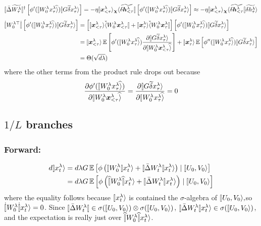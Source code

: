 \documentclass{article}
\theoremstyle{plain}
\theoremstyle{definition}
\begin{document}
\[
\oplim{\bar{\Delta}\widetilde{W_{\tau}^{\lambda}}}^{\dagger}\left[\phi'(\hatket{W_{0}^{\lambda}x_{\tau}^{\lambda}})\ket{G\tilde\delta x_{\tau}^{\lambda}}\right]=-\eta\ketdbra{\xx_{<\tau}^{\lambda}}{\cchi}{\widetilde{\delta\hh_{<\tau}^{\lambda}}}\left[\phi'(\hatket{W_{0}^{\lambda}x_{\tau}^{\lambda}})\ket{G\tilde\delta x_{\tau}^{\lambda}}\right]\approx-\eta\ketdbra{\xx_{<\tau}^{\lambda}}{\cchi}{\widetilde{\delta\hh_{<\tau}^{\lambda}}}\widetilde{\delta h_{\tau}^{\lambda}}\ra
\]
\begin{align*}
\dotoplim{W_{0}^{\lambda\trsp}}\left[\phi'(\hatket{W_{0}^{\lambda}x_{\tau}^{\lambda}})\ket{G\tilde\delta x_{\tau}^{\lambda}}\right] & =\left[\ket{\xx_{<\tau}^{\lambda}}\dbra{W_{0}^{\lambda}\xx_{<\tau}^{\lambda}}+\ket{\xx_{\tau}^{\lambda}}\dbra{W_{0}^{\lambda}\xx_{\tau}^{\lambda}}\right]\left[\phi'(\hatket{W_{0}^{\lambda}x_{\tau}^{\lambda}})\ket{G\tilde\delta x_{\tau}^{\lambda}}\right]\\
 & =\ket{\xx_{<\tau}^{\lambda}}\EV\left[\phi'(\hatket{W_{0}^{\lambda}x_{\tau}^{\lambda}})\frac{\partial\ket{G\tilde\delta x_{\tau}^{\lambda}}}{\partial\hatket{W_{0}^{\lambda}\xx_{<\tau}^{\lambda}}}\right]+\ket{\xx_{\tau}^{\lambda}}\EV\left[\phi''(\hatket{W_{0}^{\lambda}x_{\tau}^{\lambda}})\ket{G\tilde\delta x_{\tau}^{\lambda}}\right]\\
 & =\Theta(\sqrt{d\lambda})
\end{align*}
where the other terms from the product rule drops out because 
\[
\frac{\partial\phi'(\hatket{W_{0}^{\lambda}x_{\tau}^{\lambda}})}{\partial\hatket{W_{0}^{\lambda}\xx_{<\tau}^{\lambda}}}=\frac{\partial\ket{G\tilde\delta x_{\tau}^{\lambda}}}{\partial\hatket{W_{0}^{\lambda}x_{\tau}^{\lambda}}}=0
\]

\subsection{$1/L$ branches}\label{heuristics:inv-depth}

\subsubsection{Forward:}

\begin{align*}
d\ket{x_{t}^{\lambda}} & =d\lambda G\EV\left[\phi\left(\oplim{W_{0}^{\lambda}}x_{t}^{\lambda}\ra+\oplim{\bar{\Delta}W_{t}^{\lambda}}x_{t}^{\lambda}\ra\right)\mid\ket{U_{0},V_{0}}\right]\\
 & =d\lambda G\EV\left[\phi\left(\hatoplim{W_{0}^{\lambda}}x_{t}^{\lambda}\ra+\oplim{\bar{\Delta}W_{t}^{\lambda}}x_{t}^{\lambda}\ra\right)\mid\ket{U_{0},V_{0}}\right]
\end{align*}
where the equality follows because $\ket{x_{t}^{\lambda}}$ is contained
the $\sigma$-algebra of $\ket{U_{0},V_{0}},$so $\dotoplim{W_{0}^{\lambda}}x_{t}^{\lambda}\ra=0$.
Since $\oplim{\bar{\Delta}W_{t}^{\lambda}}\in\sigma(\ket{U_{0},V_{0}})\otimes\sigma(\ket{U_{0},V_{0}})$,
$\oplim{\bar{\Delta}W_{t}^{\lambda}}x_{t}^{\lambda}\ra\in\sigma(\ket{U_{0},V_{0}})$,
and the expectation is really just over $\hatoplim{W_{0}^{\lambda}}x_{t}^{\lambda}\ra$.
\end{document}
